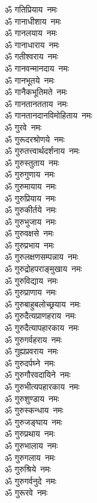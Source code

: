\begin{multicols}{2}
\begin{flushleft}
ॐ गतिप्रियाय~नमः\\
ॐ गानाधीशाय~नमः\\
ॐ गानलयाय~नमः\hfill{}\\
ॐ गानाधाराय~नमः\\
ॐ गतीश्वराय~नमः\\
ॐ गानवन्मानदाय~नमः\\
ॐ गानभूतये~नमः\\
ॐ गानैकभूतिमते~नमः\\
ॐ गानतानतताय~नमः\\
ॐ गानतानदानविमोहिताय~नमः\\
ॐ गुरवे~नमः\\
ॐ गुरूदरश्रोणये~नमः\\
ॐ गुरुतत्त्वार्थदर्शनाय~नमः\hfill{}\\
ॐ गुरुस्तुताय~नमः\\
ॐ गुरुगुणाय~नमः\\
ॐ गुरुमायाय~नमः\\
ॐ गुरुप्रियाय~नमः\\
ॐ गुरुकीर्तये~नमः\\
ॐ गुरुभुजाय~नमः\\
ॐ गुरुवक्षसे~नमः\\
ॐ गुरुप्रभाय~नमः\\
ॐ गुरुलक्षणसम्पन्नाय~नमः\\
ॐ गुरुद्रोहपराङ्मुखाय~नमः\hfill{}\\
ॐ गुरुविद्याय~नमः\\
ॐ गुरुप्राणाय~नमः\\
ॐ गुरुबाहुबलोच्छ्रयाय~नमः\\
ॐ गुरुदैत्यप्राणहराय~नमः\\
ॐ गुरुदैत्यापहारकाय~नमः\\
ॐ गुरुगर्वहराय~नमः\\
ॐ गुह्यप्रवराय~नमः\\
ॐ गुरुदर्पघ्ने~नमः\\
ॐ गुरुगौरवदायिने~नमः\\
ॐ गुरुभीत्यपहारकाय~नमः\hfill{}\\
ॐ गुरुशुण्डाय~नमः\\
ॐ गुरुस्कन्धाय~नमः\\
ॐ गुरुजङ्घाय~नमः\\
ॐ गुरुप्रथाय~नमः\\
ॐ गुरुभालाय~नमः\\
ॐ गुरुगलाय~नमः\\
ॐ गुरुश्रिये~नमः\\
ॐ गुरुगर्वनुदे~नमः\\
ॐ गुरूरवे~नमः\\

\end{flushleft}
\end{multicols}
